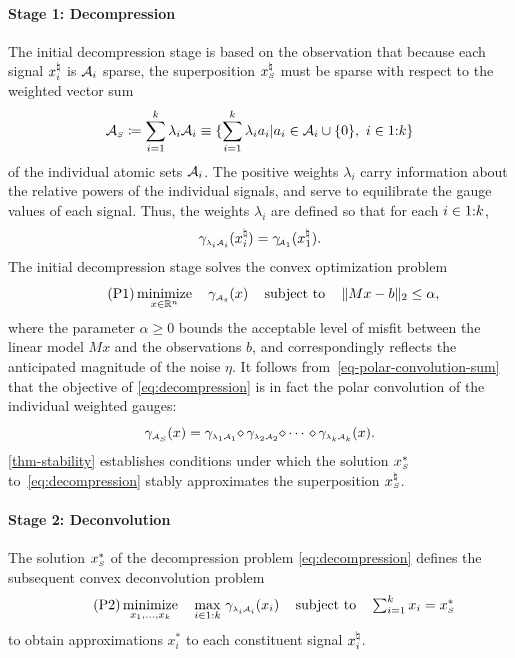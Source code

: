 \paragraph{Stage 1: Decompression} The initial decompression stage is based on the observation
that because each signal $x_i^{\natural}$ is $\mathcal{A}_i$ sparse, the superposition $x_{\scriptscriptstyle S}^\natural$
must be sparse with respect to the weighted vector sum
\begin{equation} \label{eq:weighted-atomic-sum}
  \Ascr\subs\coloneqq\sum_{i=1}^k\lambda_i\Ascr_i
  \equiv \{\sum_{i=1}^k\lambda_ia_i | a_i\in\Ascr_i\cup\{0\},\ i\in\irange1k\}
\end{equation}
of the individual atomic sets $\mathcal{A}_i$. The positive weights $\lambda_i$ carry information about the relative powers of the individual signals, and serve to equilibrate the gauge values of each signal. Thus, the weights $\lambda_i$ are defined so that for each $i\in1\mathord{:}k$,
\begin{equation}\label{eq-lambda-def}
  \gamma_{\scriptscriptstyle\lambda_i\mathcal{A}_i}(x_i^{\natural})=\gamma_{\!\scriptscriptstyle\mathcal{A}_1}(x_1^{\natural}). 
\end{equation}
The initial decompression stage solves the convex optimization problem
\begin{equation} \tag{P1} \label{eq:decompression}
  \displaystyle\mathop{\hbox{\rm minimize}}_{x\in\mathbb{R}^n}\enspace\enspace \gamma_{\scriptscriptstyle\mathcal{A}_s}(x) \enspace\enspace\mathop{\hbox{\rm subject to}}\enspace\enspace \|Mx - b\|_2 \leq \alpha,
\end{equation}
where the parameter $\alpha\ge0$ bounds the acceptable level of misfit between the linear model \(Mx\) and the observations $b$, and correspondingly reflects the anticipated magnitude of the noise $\eta$. It follows from~\eqref{eq-polar-convolution-sum} that the objective of \eqref{eq:decompression} is in fact the polar convolution of the individual weighted gauges:
\begin{equation*}
   \gauge_{\scriptscriptstyle\Ascr\subs}(x)
   = \gauge_{\scriptscriptstyle\lambda_1\Ascr_1}\maxconv\gauge_{\scriptscriptstyle\lambda_2\Ascr_2}\maxconv\cdots\ \maxconv\gauge_{\scriptscriptstyle\lambda_k\Ascr_k}(x).
\end{equation*}
\autoref{thm-stability} establishes conditions under which the solution $x_{\scriptscriptstyle S}^*$ to~\eqref{eq:decompression} stably approximates the superposition $x_{\scriptscriptstyle S}^\natural$.

\paragraph{Stage 2: Deconvolution} The solution $x_{\scriptscriptstyle S}^*$ of the decompression problem \eqref{eq:decompression} defines the subsequent convex deconvolution problem
\begin{equation} \tag{P2} \label{eq:deconvolution}
  \displaystyle\mathop{\hbox{\rm minimize}}_{x_1, \ldots, x_k}\enspace
  \enspace \max_{i\in1:k}\, \gamma_{\scriptscriptstyle\lambda_i\mathcal{A}_i}(x_i)
  \enspace\enspace\mathop{\hbox{\rm subject to}}\enspace\enspace
  \textstyle\sum_{i = 1}^k x_i = x_{\scriptscriptstyle S}^*
\end{equation}
to obtain approximations $x_i^*$ to each constituent signal $x_i^{\natural}$. 

